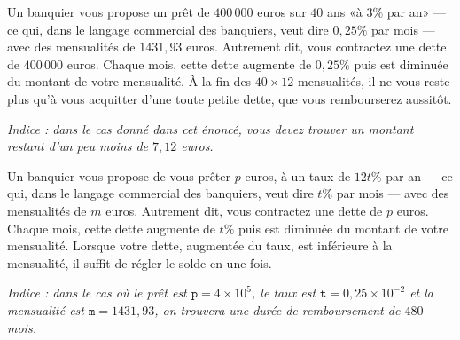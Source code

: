 
Un banquier vous  propose un prêt de $400\,000$ euros  sur $40$ ans «à
$3\%$ par  an» ---  ce qui, dans  le langage commercial  des banquiers,
veut  dire $0,25\%$  par mois  ---  avec des  mensualités de  $1431,93$
euros.  Autrement  dit,  vous   contractez  une  dette  de  $400\,000$
euros. Chaque mois, cette dette  augmente de $0,25\%$ puis est diminuée
du  montant  de  votre  mensualité.  À  la  fin  des  $40  \times  12$
mensualités, il  ne vous  reste plus qu'à  vous acquitter  d'une toute
petite dette, que vous rembourserez aussitôt.



\emph{Indice : dans le cas donné dans cet énoncé, vous devez trouver un montant
restant d'un peu moins de $7,12$ euros.}




  
Un banquier vous propose de vous prêter $p$ euros, à un taux de $12t\%$ par an ---  ce qui, dans  le langage commercial  des banquiers,
veut  dire $t\%$  par mois  --- avec des  mensualités de  $m$ euros. Autrement  dit,  vous   contractez  une  dette  de  $p$
euros. Chaque mois, cette dette  augmente de $t\%$ puis est diminuée du  montant  de  votre  mensualité. Lorsque votre dette, augmentée du taux, est inférieure à la mensualité, il suffit de régler le solde en une fois.



\emph{Indice : dans le cas où le prêt est $\texttt{p}=4\times10^5$, le taux est $\texttt{t}=0,25\times10^{-2}$ et la mensualité est $\texttt{m}=1431,93$, on trouvera une durée de remboursement de $480$ mois.}

